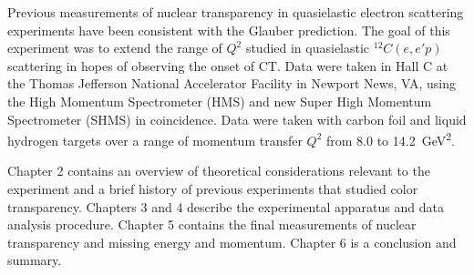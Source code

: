 Previous measurements of nuclear transparency in quasielastic electron
scattering experiments have been consistent with the Glauber prediction.
The goal of this experiment was to extend the range of $Q^2$ studied
in quasielastic ${}^{12}C(e,e'p)$ scattering in hopes of observing the onset
of CT.
Data were taken in Hall C at the Thomas Jefferson National Accelerator Facility
in Newport News, VA, using the High Momentum Spectrometer (HMS) and new Super
High Momentum Spectrometer (SHMS) in coincidence.
Data were taken with carbon foil and liquid hydrogen targets over a range of
momentum transfer $Q^2$ from 8.0 to \SI{14.2}{\giga\electronvolt\squared}.


Chapter 2 contains an overview of theoretical considerations relevant to
the experiment and a brief history of previous experiments that studied color
transparency.
Chapters 3 and 4 describe the experimental apparatus and data analysis
procedure.
Chapter 5 contains the final measurements of nuclear transparency and missing
energy and momentum.
Chapter 6 is a conclusion and summary.
